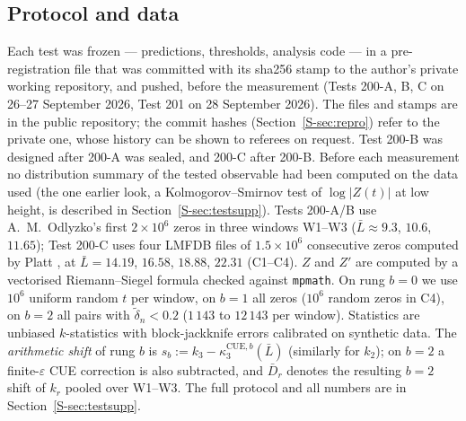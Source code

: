 \documentclass[12pt]{amsart}
\theoremstyle{remark}
\newcommand{\eps}{\varepsilon}
\newcommand{\1}{\mathbf{1}}
\begin{document}
\subsection*{Protocol and data}
Each test was frozen --- predictions, thresholds, analysis code --- in a
pre-registration file that was committed with its sha256 stamp to the
author's private working repository, and pushed, before the measurement
(Tests 200-A, B, C on 26--27 September 2026, Test 201 on 28 September 2026).
The files and stamps are in the public repository; the commit hashes
(Section~\ref{S-sec:repro}) refer to the private one, whose history can be
shown to referees on request. Test 200-B was designed after 200-A was
sealed, and 200-C after 200-B. Before each measurement no distribution
summary of the tested observable had been computed on the data used (the
one earlier look, a Kolmogorov--Smirnov test of $\log|Z(t)|$ at low height,
is described in Section~\ref{S-sec:testsupp}). Tests 200-A/B use
A.~M.~Odlyzko's first $2\times10^6$ zeros \cite{OdlyzkoTables,Odl87} in
three windows W1--W3 ($\bar L\approx9.3$, $10.6$, $11.65$); Test 200-C uses
four LMFDB files of $1.5\times10^6$ consecutive zeros computed by Platt
\cite{LMFDB,Pla15}, at $\bar L=14.19$, $16.58$, $18.88$, $22.31$ (C1--C4).
$Z$ and $Z'$ are computed by a vectorised Riemann--Siegel formula checked
against \texttt{mpmath}. On rung $b=0$ we use $10^6$ uniform random $t$ per
window, on $b=1$ all zeros ($10^6$ random zeros in C4), on $b=2$ all pairs
with $\tilde\delta_n<0.2$ ($1\,143$ to $12\,143$ per window). Statistics
are unbiased $k$-statistics with block-jackknife errors calibrated on
synthetic data. The \emph{arithmetic shift} of rung $b$ is
$s_b:=k_3-\kappa_3^{\mathrm{CUE},b}(\bar L)$ (similarly for $k_2$); on
$b=2$ a finite-$\eps$ CUE correction is also subtracted, and $\bar D_r$
denotes the resulting $b=2$ shift of $k_r$ pooled over W1--W3. The full protocol
and all numbers are in Section~\ref{S-sec:testsupp}.
\end{document}
